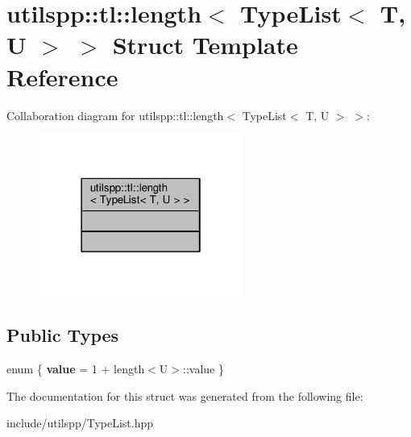 \hypertarget{structutilspp_1_1tl_1_1length_3_01TypeList_3_01T_00_01U_01_4_01_4}{\section{utilspp\-:\-:tl\-:\-:length$<$ Type\-List$<$ T, U $>$ $>$ Struct Template Reference}
\label{structutilspp_1_1tl_1_1length_3_01TypeList_3_01T_00_01U_01_4_01_4}
}


Collaboration diagram for utilspp\-:\-:tl\-:\-:length$<$ Type\-List$<$ T, U $>$ $>$\-:
\nopagebreak
\begin{figure}[H]
\begin{center}
\leavevmode
\includegraphics[width=190pt]{structutilspp_1_1tl_1_1length_3_01TypeList_3_01T_00_01U_01_4_01_4__coll__graph}
\end{center}
\end{figure}
\subsection*{Public Types}
\begin{DoxyCompactItemize}
\item 
enum \{ {\bfseries value} = 1 + length$<$U$>$\-:\-:value
 \}
\end{DoxyCompactItemize}


The documentation for this struct was generated from the following file\-:\begin{DoxyCompactItemize}
\item 
include/utilspp/Type\-List.\-hpp\end{DoxyCompactItemize}
